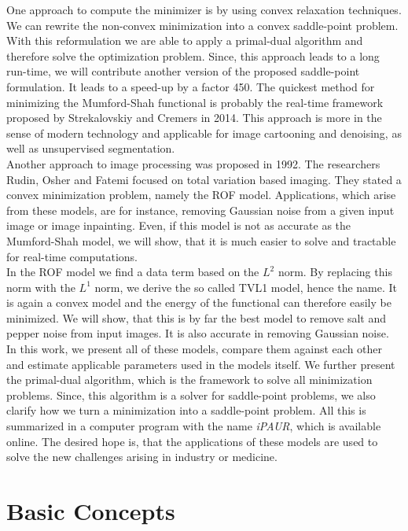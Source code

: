 \documentclass{scrreprt}
\begin{document}
    One approach to compute the minimizer is by using convex relaxation techniques. We can rewrite the non-convex minimization into a convex saddle-point problem. With this reformulation we are able to apply a primal-dual algorithm and therefore solve the optimization problem. Since, this approach leads to a long run-time, we will contribute another version of the proposed saddle-point formulation. It leads to a speed-up by a factor 450. The quickest method for minimizing the Mumford-Shah functional is probably the real-time framework proposed by Strekalovskiy and Cremers in 2014. This approach is more in the sense of modern technology and applicable for image cartooning and denoising, as well as unsupervised segmentation.\\
    Another approach to image processing was proposed in 1992. The researchers Rudin, Osher and Fatemi focused on total variation based imaging. They stated a convex minimization problem, namely the ROF model. Applications, which arise from these models, are for instance, removing Gaussian noise from a given input image or image inpainting. Even, if this model is not as accurate as the Mumford-Shah model, we will show, that it is much easier to solve and tractable for real-time computations.\\
    In the ROF model we find a data term based on the $L^{2}$ norm. By replacing this norm with the $L^{1}$ norm, we derive the so called TVL1 model, hence the name. It is again a convex model and the energy of the functional can therefore easily be minimized. We will show, that this is by far the best model to remove salt and pepper noise from input images. It is also accurate in removing Gaussian noise.\\
    In this work, we present all of these models, compare them against each other and estimate applicable parameters used in the models itself. We further present the primal-dual algorithm, which is the framework to solve all minimization problems. Since, this algorithm is a solver for saddle-point problems, we also clarify how we turn a minimization into a saddle-point problem. All this is summarized in a computer program with the name \textit{iPAUR}, which is available online. The desired hope is, that the applications of these models are used to solve the new challenges arising in industry or medicine.
    

\chapter{Basic Concepts} %
\label{cha:basic_concepts}
\end{document}
